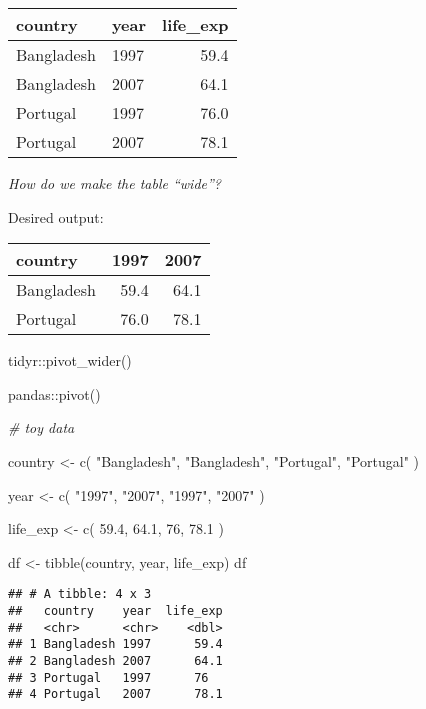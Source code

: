 \documentclass[
]{book}
\newenvironment{Shaded}{\begin{snugshade}}{\end{snugshade}}
\newcommand{\CommentTok}[1]{\textcolor[rgb]{0.56,0.35,0.01}{\textit{#1}}}
\newcommand{\DecValTok}[1]{\textcolor[rgb]{0.00,0.00,0.81}{#1}}
\newcommand{\FloatTok}[1]{\textcolor[rgb]{0.00,0.00,0.81}{#1}}
\newcommand{\FunctionTok}[1]{\textcolor[rgb]{0.00,0.00,0.00}{#1}}
\newcommand{\NormalTok}[1]{#1}
\newcommand{\OtherTok}[1]{\textcolor[rgb]{0.56,0.35,0.01}{#1}}
\newcommand{\StringTok}[1]{\textcolor[rgb]{0.31,0.60,0.02}{#1}}
\begin{document}
\begin{longtable}[]{@{}llr@{}}
\toprule
country & year & life\_exp \\
\midrule
\endhead
Bangladesh & 1997 & 59.4 \\
Bangladesh & 2007 & 64.1 \\
Portugal & 1997 & 76.0 \\
Portugal & 2007 & 78.1 \\
\bottomrule
\end{longtable}

{\emph{How do we make the table ``wide''?}}

Desired output:

\begin{longtable}[]{@{}lrr@{}}
\toprule
country & 1997 & 2007 \\
\midrule
\endhead
Bangladesh & 59.4 & 64.1 \\
Portugal & 76.0 & 78.1 \\
\bottomrule
\end{longtable}

tidyr::pivot\_wider()

pandas::pivot()

\begin{Shaded}
\begin{Highlighting}[]
\CommentTok{\# toy data}

\NormalTok{country }\OtherTok{\textless{}{-}} \FunctionTok{c}\NormalTok{(}
  \StringTok{"Bangladesh"}\NormalTok{, }\StringTok{"Bangladesh"}\NormalTok{,}
  \StringTok{"Portugal"}\NormalTok{, }\StringTok{"Portugal"}
\NormalTok{)}

\NormalTok{year }\OtherTok{\textless{}{-}} \FunctionTok{c}\NormalTok{(}
  \StringTok{"1997"}\NormalTok{, }\StringTok{"2007"}\NormalTok{,}
  \StringTok{"1997"}\NormalTok{, }\StringTok{"2007"}
\NormalTok{)}

\NormalTok{life\_exp }\OtherTok{\textless{}{-}} \FunctionTok{c}\NormalTok{(}
  \FloatTok{59.4}\NormalTok{, }\FloatTok{64.1}\NormalTok{,}
  \DecValTok{76}\NormalTok{, }\FloatTok{78.1}
\NormalTok{)}

\NormalTok{df }\OtherTok{\textless{}{-}} \FunctionTok{tibble}\NormalTok{(country, year, life\_exp)}
\NormalTok{df}
\end{Highlighting}
\end{Shaded}

\begin{verbatim}
## # A tibble: 4 x 3
##   country    year  life_exp
##   <chr>      <chr>    <dbl>
## 1 Bangladesh 1997      59.4
## 2 Bangladesh 2007      64.1
## 3 Portugal   1997      76  
## 4 Portugal   2007      78.1
\end{verbatim}
\end{document}

